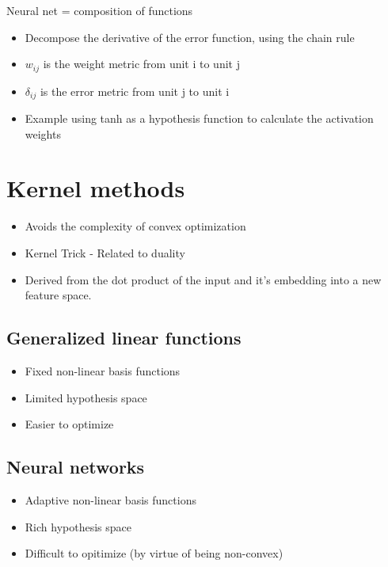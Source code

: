 \documentclass[parskip=half]{scrartcl}
\begin{document}
    Neural net = composition of functions
    \begin{itemize}
        \item
        Decompose the derivative of the error function, using the chain rule
        \item
        $w_{ij}$ is the weight metric from unit i to unit j
        \item
        $\delta_{ij}$ is the error metric from unit j to unit i
        \item
        Example using tanh as a hypothesis function to calculate the
        activation weights
    \end{itemize}


\newpage


\section{Kernel methods}\label{kernel-methods}

    \begin{itemize}
        \item
        Avoids the complexity of convex optimization
        \item
        Kernel Trick - Related to duality
        \item
        Derived from the dot product of the input and it's embedding into a
        new feature space.
    \end{itemize}

    \subsection{Generalized linear
    functions}\label{generalized-linear-functions}

    \begin{itemize}
        \item
        Fixed non-linear basis functions
        \item
        Limited hypothesis space
        \item
        Easier to optimize
    \end{itemize}

    \subsection{Neural networks}\label{neural-networks}

    \begin{itemize}
        \item
        Adaptive non-linear basis functions
        \item
        Rich hypothesis space
        \item
        Difficult to opitimize (by virtue of being non-convex)
    \end{itemize}
\end{document}
